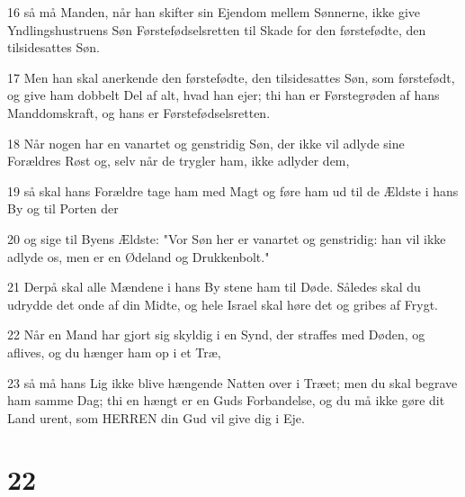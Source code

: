 \par 16 så må Manden, når han skifter sin Ejendom mellem Sønnerne, ikke give Yndlingshustruens Søn Førstefødselsretten til Skade for den førstefødte, den tilsidesattes Søn.
\par 17 Men han skal anerkende den førstefødte, den tilsidesattes Søn, som førstefødt, og give ham dobbelt Del af alt, hvad han ejer; thi han er Førstegrøden af hans Manddomskraft, og hans er Førstefødselsretten.
\par 18 Når nogen har en vanartet og genstridig Søn, der ikke vil adlyde sine Forældres Røst og, selv når de trygler ham, ikke adlyder dem,
\par 19 så skal hans Forældre tage ham med Magt og føre ham ud til de Ældste i hans By og til Porten der
\par 20 og sige til Byens Ældste: "Vor Søn her er vanartet og genstridig: han vil ikke adlyde os, men er en Ødeland og Drukkenbolt."
\par 21 Derpå skal alle Mændene i hans By stene ham til Døde. Således skal du udrydde det onde af din Midte, og hele Israel skal høre det og gribes af Frygt.
\par 22 Når en Mand har gjort sig skyldig i en Synd, der straffes med Døden, og aflives, og du hænger ham op i et Træ,
\par 23 så må hans Lig ikke blive hængende Natten over i Træet; men du skal begrave ham samme Dag; thi en hængt er en Guds Forbandelse, og du må ikke gøre dit Land urent, som HERREN din Gud vil give dig i Eje.

\chapter{22}

